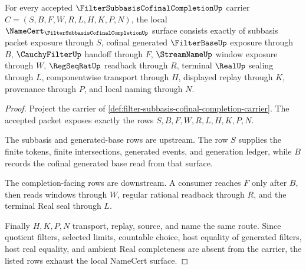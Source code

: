 \begin{theorem}
\label{thm:filter-subbasis-cofinal-completion-namecert-obligations}
For every accepted $\FilterSubbasisCofinalCompletionUp$ carrier $C=(S,B,F,W,R,L,H,K,P,N)$, the local $\NameCert_{\FilterSubbasisCofinalCompletionUp}$ surface consists exactly of subbasis packet exposure through $S$, cofinal generated $\FilterBaseUp$ exposure through $B$, $\CauchyFilterUp$ handoff through $F$, $\StreamNameUp$ window exposure through $W$, $\RegSeqRatUp$ readback through $R$, terminal $\RealUp$ sealing through $L$, componentwise transport through $H$, displayed replay through $K$, provenance through $P$, and local naming through $N$.
\end{theorem}
\begin{proof}
Project the carrier of \autoref{def:filter-subbasis-cofinal-completion-carrier}. The accepted packet exposes exactly the rows $S,B,F,W,R,L,H,K,P,N$.

The subbasis and generated-base rows are upstream. The row $S$ supplies the finite tokens, finite intersections, generated events, and generation ledger, while $B$ records the cofinal generated base read from that surface.

The completion-facing rows are downstream. A consumer reaches $F$ only after $B$, then reads windows through $W$, regular rational readback through $R$, and the terminal Real seal through $L$.

Finally $H,K,P,N$ transport, replay, source, and name the same route. Since quotient filters, selected limits, countable choice, host equality of generated filters, host real equality, and ambient Real completeness are absent from the carrier, the listed rows exhaust the local NameCert surface.
\end{proof}


